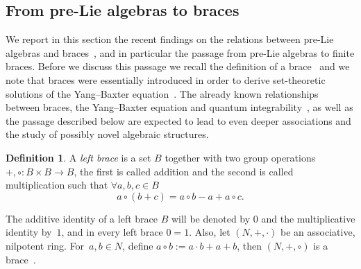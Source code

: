 \documentclass[pdftex]{sigma}
\numberwithin{equation}{section}
\theoremstyle{definition}
\newtheorem{defn}[thm]{Definition}
\begin{document}
\subsection{From pre-Lie algebras to braces}\label{section2.2}
We report in this section the recent findings on the relations between pre-Lie algebras and braces~\cite{Rump, Smok1, Smok2}, and in particular the passage from pre-Lie algebras to finite braces. Before we discuss this passage we recall the definition of a brace~\cite{Jesp, Rump1} and we note that braces were essentially introduced in order to derive set-theoretic solutions of the Yang--Baxter equation~\cite{Rump1}.
The already known relationships between braces, the Yang--Baxter equation and quantum integrability~\cite{DoiSmo2, DoiSmo1}, as well as the passage described below are expected to lead to even deeper associations and the study of possibly novel algebraic structures.

\begin{defn}
A {\it left brace} is a set $B$ together with two group operations $+,\circ\colon B\times B\to B$,
the first is called addition and the second is called multiplication such that $\forall a,b,c\in B$
\begin{equation*}%
a\circ (b+c)=a\circ b-a+a\circ c.
\end{equation*}
\end{defn}

The additive identity of a left brace $B$ will be denoted by $0$ and the multiplicative identity by~$1$, and in every left brace $0=1$. Also, let $(N,+, \cdot)$ be an {associative, nilpotent} ring. For~${a, b \in N}$, define $a \circ b := a \cdot b + a + b$, then $(N,+, \circ )$ is a brace~\cite{Rump1}.
\end{document}
